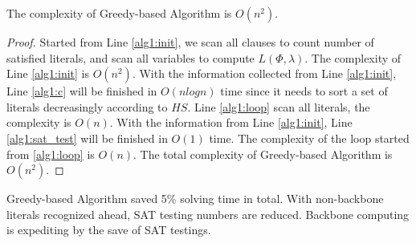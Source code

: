 \begin{theorem}
The complexity of Greedy-based Algorithm is $O(n^2)$.
\end{theorem}

\begin{proof}
Started from Line \ref{alg1:init}, we scan all clauses to count number of satisfied literals, and scan all variables to compute $L(\Phi,\lambda)$. The complexity of Line \ref{alg1:init} is $O(n^2)$. With the information collected from Line \ref{alg1:init}, Line \ref{alg1:c} will be finished in $O(nlogn)$ time since it needs to sort a set of literals decreasingly according to $HS$.  Line \ref{alg1:loop} scan all literals, the complexity is $O(n)$. With the information from Line \ref{alg1:init}, Line \ref{alg1:sat_test} will be finished in $O(1)$ time. The complexity of the loop started from \ref{alg1:loop} is $O(n)$. The total complexity of Greedy-based Algorithm is $O(n^2)$.
\end{proof}

Greedy-based Algorithm saved 5\% solving time in total. With non-backbone literals recognized ahead, SAT testing numbers are reduced. Backbone computing is expediting by the save of SAT testings.
